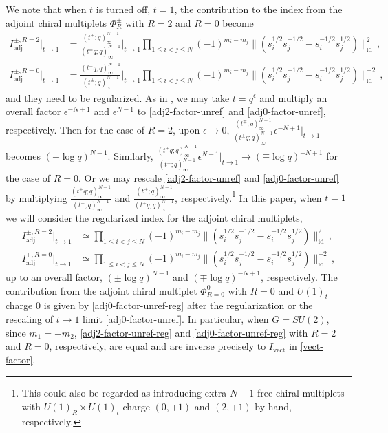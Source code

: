\documentclass[11pt,hyper,a4paper]{article}
\begin{document}
We note that when $t$ is turned off, $t=1$, the contribution to the index from the adjoint chiral multiplets $\Phi^{\pm}_R$ with $R=2$ and $R=0$ become
\begin{align}
 I^{\pm,R=2}_{\text{adj}} \Big|_{t \rightarrow 1} &= \frac{( t^{\mp} ;q)^{N-1}_\infty}{( t^{\pm}  q;q)_\infty^{N-1}} \bigg|_{t \rightarrow 1} \prod_{1\leq i < j \leq N} (-1)^{m_i-m_j} \| (s_i^{1/2} s_j^{-1/2} - s_i^{-1/2} s_j^{1/2}) \|_{\text{id}}^2	\,	,	\label{adj2-factor-unref}	\\
 I^{\pm,R=0}_{\text{adj}} \Big|_{t \rightarrow 1} &= \frac{( t^{\mp} q;q)^{N-1}_\infty}{( t^{\pm} ;q)_\infty^{N-1}} \bigg|_{t \rightarrow 1} \prod_{1\leq i < j \leq N} (-1)^{m_i-m_j} \| (s_i^{1/2} s_j^{-1/2} - s_i^{-1/2} s_j^{1/2}) \|_{\text{id}}^{-2}		\,	,	\label{adj0-factor-unref}
\end{align}
and they need to be regularized.
As in \cite{Gukov-Pei-Putrov-Vafa, Pei-Ye}, we may take $t=q^{\epsilon}$ and multiply an overall factor $\epsilon^{-N+1}$ and $\epsilon^{N-1}$ to \eqref{adj2-factor-unref} and \eqref{adj0-factor-unref}, respectively.
Then for the case of $R=2$, upon $\epsilon \rightarrow 0$, $\frac{( t^{\mp} ;q)^{N-1}_\infty}{( t^{\pm}  q;q)_\infty^{N-1}} \epsilon^{-N+1} \Big|_{t \rightarrow 1} $ becomes $(\pm \log q)^{N-1}$.
Similarly, $\frac{( t^{\mp} q;q)^{N-1}_\infty}{( t^{\pm} ;q)_\infty^{N-1}} \epsilon^{N-1} \Big|_{t \rightarrow 1}  \rightarrow (\mp \log q)^{-N+1}$ for the case of $R=0$.
Or we may rescale \eqref{adj2-factor-unref} and \eqref{adj0-factor-unref} by multiplying $\frac{( t^{\pm}  q;q)_\infty^{N-1}}{( t^{\mp} ;q)^{N-1}_\infty}$ and $\frac{( t^{\pm} ;q)_\infty^{N-1}}{( t^{\mp} q;q)^{N-1}_\infty}$, respectively.\footnote{This could also be regarded as introducing extra $N-1$ free chiral multiplets with $U(1)_R \times U(1)_t$ charge $(0, \mp 1)$ and $(2, \mp 1)$ by hand, respectively.}
In this paper, when $t=1$ we will consider the regularized index for the adjoint chiral multiplets,
\begin{align}
 I^{\pm,R=2}_{\text{adj}} \Big|_{t \rightarrow 1} &\simeq \prod_{1\leq i < j \leq N} (-1)^{m_i-m_j} \| (s_i^{1/2} s_j^{-1/2} - s_i^{-1/2} s_j^{1/2}) \|_{\text{id}}^2	\,	,	\label{adj2-factor-unref-reg}	\\
 I^{\pm,R=0}_{\text{adj}} \Big|_{t \rightarrow 1} &\simeq \prod_{1\leq i < j \leq N} (-1)^{m_i-m_j} \| (s_i^{1/2} s_j^{-1/2} - s_i^{-1/2} s_j^{1/2}) \|_{\text{id}}^{-2}		\,	,	\label{adj0-factor-unref-reg}
\end{align}
up to an overall factor, $(\pm \log q)^{N-1}$ and $(\mp \log q)^{-N+1}$, respectively.
The contribution from the adjoint chiral multiplet $\Phi_{R=0}^0$ with $R=0$ and $U(1)_t$ charge 0 is given by \eqref{adj0-factor-unref-reg} after the regularization or the rescaling of $t\rightarrow 1$ limit \eqref{adj0-factor-unref}.
In particular, when $G=SU(2)$, since $m_1=-m_2$, \eqref{adj2-factor-unref-reg} and \eqref{adj0-factor-unref-reg} with $R=2$ and $R=0$, respectively, are equal and are inverse precisely to $I_{\text{vect}}$ in \eqref{vect-factor}.	\\
\end{document}
